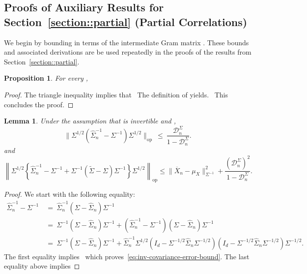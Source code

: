 \documentclass{article}
\newtheorem{lemma}{Lemma}
\newtheorem{proposition}{Proposition}
\begin{document}
\begin{appendices}
\section{Proofs of Auxiliary Results for Section~\ref{section::partial} (Partial Correlations)}
\label{appendix:auxiliary.partial}
We begin by bounding   in terms of the intermediate Gram matrix  . These bounds and associated derivations are be used repeatedly in the proofs of the results from Section~\ref{section::partial}.
\begin{proposition}\label{prop:bounding-D-sigma}
For every  ,
\ \end{proposition}
\begin{proof}
The triangle inequality implies that
\ The definition of   yields.
\ This concludes the proof.
\end{proof}
\begin{lemma}\label{lemma:linear-expansion-inv-covariance}
Under the assumption that   is invertible and  ,
\begin{equation}\label{eq:inv-covariance-error-bound}
\|\Sigma^{1/2}(\widehat{\Sigma}_n^{-1} - \Sigma^{-1})\Sigma^{1/2}\|_{\mathrm{op}} ~\le~ \frac{\mathcal{D}_n^{\Sigma}}{1 - \mathcal{D}_n^{\Sigma}}.
\end{equation}
and
\begin{equation}\label{eq:final-linear-expansion-inv-covariance}
\left\|\Sigma^{1/2}\left\{\widehat{\Sigma}_n^{-1} - \Sigma^{-1} + \Sigma^{-1}(\widetilde{\Sigma} - \Sigma)\Sigma^{-1}\right\}\Sigma^{1/2}\right\|_{\mathrm{op}} \le \|\overline{X}_n - \mu_X\|^2_{\Sigma^{-1}} + \frac{(\mathcal{D}_n^{\Sigma})^2}{1 - \mathcal{D}_n^{\Sigma}}.
\end{equation}
\end{lemma}
\begin{proof}
We start with the following equality:
\begin{align*}
\widehat{\Sigma}_n^{-1} - \Sigma^{-1} ~&=~ \widehat{\Sigma}_n^{-1}(\Sigma - \widehat{\Sigma}_n)\Sigma^{-1}\\ ~&=~ \Sigma^{-1}(\Sigma - \widehat{\Sigma}_n)\Sigma^{-1} + (\widehat{\Sigma}_n^{-1} - \Sigma^{-1})(\Sigma - \widehat{\Sigma}_n)\Sigma^{-1}\\ ~&=~ \Sigma^{-1}(\Sigma - \widehat{\Sigma}_n)\Sigma^{-1} + \widehat{\Sigma}_n^{-1}\Sigma^{1/2}(I_d - \Sigma^{-1/2}\widehat{\Sigma}_n\Sigma^{-1/2})(I_d - \Sigma^{-1/2}\widehat{\Sigma}_n\Sigma^{-1/2})\Sigma^{-1/2}.
\end{align*}
The first equality implies
\ which proves~\eqref{eq:inv-covariance-error-bound}. The last equality above implies

\end{proof}
\end{appendices}
\end{document}
